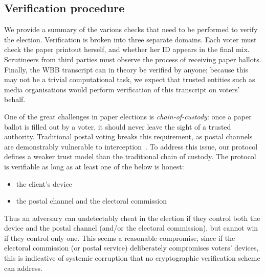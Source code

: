 \documentclass[12pt,a4paper]{article}
\theoremstyle{definition}
\begin{document}
\subsection{Verification procedure}
We provide a summary of the various checks that need to be performed to verify the election. Verification is broken into three separate domains. Each voter must check the paper printout herself, and whether her ID appears in the final mix. Scrutineers from third parties must observe the process of receiving paper ballots. Finally, the WBB transcript can in theory be verified by anyone; because this may not be a trivial computational task, we expect that trusted entities such as media organisations would perform verification of this transcript on voters' behalf.

One of the great challenges in paper elections is \textit{chain-of-custody}: once a paper ballot is filled out by a voter, it should never leave the sight of a trusted authority. Traditional postal voting breaks this requirement, as postal channels are demonstrably vulnerable to interception~\cite{stewart2010losing}. To address this issue, our protocol defines a weaker trust model than the traditional chain of custody. The protocol is verifiable as long as at least one of the below is honest:
\begin{itemize}
    \item the client's device
    \item the postal channel and the electoral commission
\end{itemize}
Thus an adversary can undetectably cheat in the election if they control both the device and the postal channel (and/or the electoral commission), but cannot win if they control only one. This seems a reasonable compromise, since if the electoral commission (or postal service) deliberately compromises voters' devices, this is indicative of systemic corruption that no cryptographic verification scheme can address.
\end{document}
